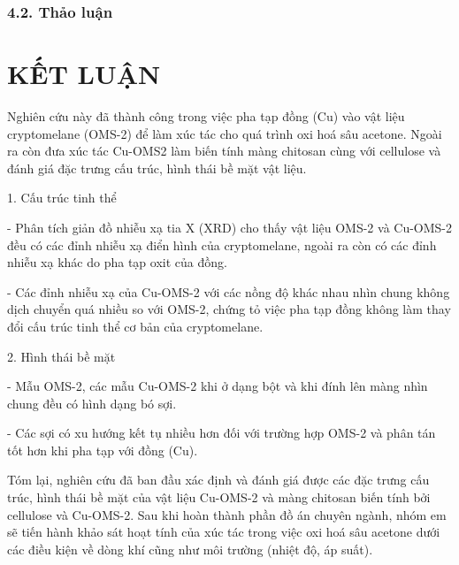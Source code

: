 \documentclass{article} %
\begin{document}
\subsubsection*{4.2. Thảo luận}
 {}
\cleardoublepage

\section*{KẾT LUẬN}
 {}

Nghiên cứu này đã thành công trong việc pha tạp đồng (Cu) vào vật liệu cryptomelane (OMS-2) để làm xúc tác cho quá trình oxi hoá sâu acetone. Ngoài ra còn đưa xúc tác Cu-OMS2 làm biến tính màng chitosan cùng với cellulose và đánh giá đặc trưng cấu trúc, hình thái bề mặt vật liệu.

1. Cấu trúc tinh thể

\hspace{0.5cm}- Phân tích giản đồ nhiễu xạ tia X (XRD) cho thấy vật liệu OMS-2 và Cu-OMS-2 đều có các đỉnh nhiễu xạ điển hình của cryptomelane, ngoài ra còn có các đỉnh nhiễu xạ khác do pha tạp oxit của đồng.

\hspace{0.5cm}- Các đỉnh nhiễu xạ của Cu-OMS-2 với các nồng độ khác nhau nhìn chung không dịch chuyển quá nhiều so với OMS-2, chứng tỏ việc pha tạp đồng không làm thay đổi cấu trúc tinh thể cơ bản của cryptomelane.

2. Hình thái bề mặt

\hspace{0.5cm}- Mẫu OMS-2, các mẫu Cu-OMS-2 khi ở dạng bột và khi đính lên màng nhìn chung đều có hình dạng bó sợi.

\hspace{0.5cm}- Các sợi có xu hướng kết tụ nhiều hơn đối với trường hợp OMS-2 và phân tán tốt hơn khi pha tạp với đồng (Cu).

Tóm lại, nghiên cứu đã ban đầu xác định và đánh giá được các đặc trưng cấu trúc, hình thái bề mặt của vật liệu Cu-OMS-2 và màng chitosan biến tính bởi cellulose và Cu-OMS-2. Sau khi hoàn thành phần đồ án chuyên ngành, nhóm em sẽ tiến hành khảo sát hoạt tính của xúc tác trong việc oxi hoá sâu acetone dưới các điều kiện về dòng khí cũng như môi trường (nhiệt độ, áp suất).

\cleardoublepage

 {}
\end{document}
